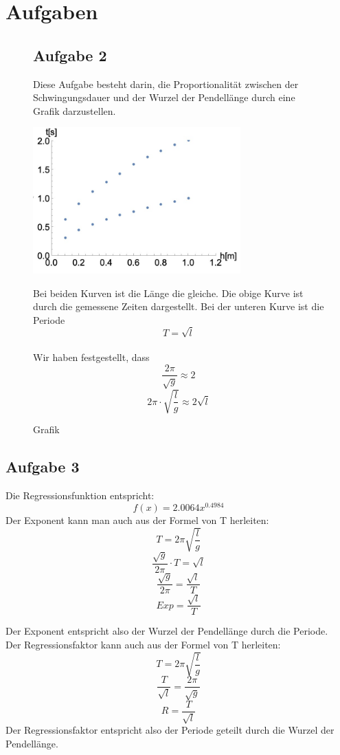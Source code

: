 \documentclass[12pt, a4paper, twoside]{article}
\begin{document}
    \section{Aufgaben}
    \begin{figure}[h]
        \subsection{Aufgabe 2}
        Diese Aufgabe besteht darin, die Proportionalität zwischen der Schwingungsdauer und der Wurzel der Pendellänge durch eine Grafik darzustellen.
        \begin{center}
            \includegraphics[width=8cm]{aufgabe2.png}
            \caption{Grafik}
            \label{fig:figure1}
        \end{center}
        Bei beiden Kurven ist die Länge die gleiche. Die obige Kurve ist durch die gemessene Zeiten dargestellt. Bei der unteren Kurve ist die Periode 
        \[T = \sqrt{l}\]
        \\Wir haben festgestellt, dass 
        \[\frac{2\pi}{\sqrt{g}} \approx 2\]
        \[2\pi \cdot \sqrt{\frac{l}{g}} \approx 2\sqrt{l}\]
    \end{figure}
        \subsection{Aufgabe 3}
        Die Regressionsfunktion entspricht:
        \[f(x)=2.0064x^{0.4984}\]
        Der Exponent kann man auch aus der Formel von T herleiten:
        \[T=2\pi \sqrt{\frac{l}{g}}\]
        \[\frac{\sqrt{g}}{2\pi}\cdot T=\sqrt{l}\]
        \[\frac{\sqrt{g}}{2\pi}=\frac{\sqrt{l}}{T}\]
        \[Exp = \frac{\sqrt{l}}{T}\]

        Der Exponent entspricht also der Wurzel der Pendellänge durch die Periode.\\

        Der Regressionsfaktor kann auch aus der Formel von T herleiten:
        \[T=2\pi \sqrt{\frac{l}{g}}\]
        \[\frac{T}{\sqrt{l}}=\frac{2\pi}{\sqrt{g}}\]
        \[R=\frac{T}{\sqrt{l}}\]
        Der Regressionsfaktor entspricht also der Periode geteilt durch die Wurzel der Pendellänge.\\
\end{document}
